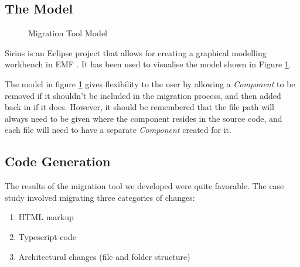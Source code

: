 \documentclass[conference]{IEEEtran}
\begin{document}
\subsection{The Model}
\begin{figure}[H]
\caption{Migration Tool Model}
\label{fig:model}
\end{figure}

Sirius is an Eclipse project that allows for creating a graphical modelling workbench in EMF \cite{b12}. It has been used to visualise the model shown in Figure \ref{fig:model}.

The model in figure \ref{fig:model} gives flexibility to the user by allowing a \textit{Component} to be removed if it shouldn’t be included in the migration process, and then added back in if it does. However, it should be remembered that the file path will always need to be given where the component resides in the source code, and each file will need to have a separate \textit{Component} created for it.

\subsection{Code Generation}
The results of the migration tool we developed were quite favorable. The case study
involved migrating three categories of changes:
\begin{enumerate}
    \item HTML markup
    \item Typescript code
    \item Architectural changes (file and folder structure)
\end{enumerate}
\end{document}

